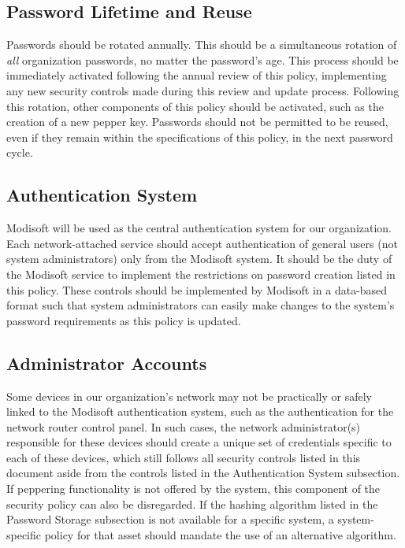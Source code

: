 \documentclass[11pt]{article}
\begin{document}
\subsection{Password Lifetime and Reuse}
\label{sec:org98fd9a4}
Passwords should be rotated annually. This should be a simultaneous rotation of \emph{all} organization passwords, no matter the password's age. This process should be immediately activated following the annual review of this policy, implementing any new security controls made during this review and update process. Following this rotation, other components of this policy should be activated, such as the creation of a new pepper key. Passwords should not be permitted to be reused, even if they remain within the specifications of this policy, in the next password cycle.

\subsection{Authentication System}
\label{sec:orgbc695e1}
Modisoft will be used as the central authentication system for our organization. Each network-attached service should accept authentication of general users (not system administrators) only from the Modisoft system. It should be the duty of the Modisoft service to implement the restrictions on password creation listed in this policy. These controls should be implemented by Modisoft in a data-based format such that system administrators can easily make changes to the system's password requirements as this policy is updated.

\subsection{Administrator Accounts}
\label{sec:org2f55f4a}
Some devices in our organization's network may not be practically or safely linked to the Modisoft authentication system, such as the authentication for the network router control panel. In such cases, the network administrator(s) responsible for these devices should create a unique set of credentials specific to each of these devices, which still follows all security controls listed in this document aside from the controls listed in the Authentication System subsection. If peppering functionality is not offered by the system, this component of the security policy can also be disregarded. If the hashing algorithm listed in the Password Storage subsection is not available for a specific system, a system-specific policy for that asset should mandate the use of an alternative algorithm.
\end{document}
